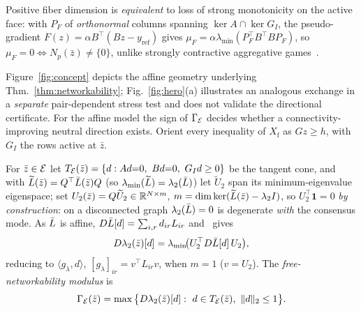 Positive fiber dimension is \emph{equivalent} to loss of strong monotonicity on the active
face: with $P_F$ of \emph{orthonormal} columns spanning $\ker A\cap\ker G_I$, the
pseudo-gradient $F(z)=\alpha B^{\top}(Bz-y_{\mathrm{ref}})$ gives
$\mu_F=\alpha\lambda_{\min}(P_F^{\top}B^{\top}BP_F)$, so $\mu_F=0\iff N_p(\bar z)\neq\{0\}$,
unlike strongly contractive aggregative games~\cite{martinezpiazuelo2022}.

Figure~\ref{fig:concept} depicts the affine geometry underlying
Thm.~\ref{thm:networkability}; Fig.~\ref{fig:hero}(a) illustrates an analogous exchange in a
\emph{separate} pair-dependent stress test and does not validate the directional certificate.
For the affine model the sign of $\Gamma_{\mathcal{E}}$ decides whether a
connectivity-improving neutral direction exists. Orient every inequality of $X_{\mathrm f}$ as
$Gz\ge h$, with $G_I$ the rows active at $\bar z$.

\begin{definition}\label{def:gamma}
For $\bar z\in\mathcal{E}$ let $T_{\Emanifold}(\bar z)=\{d:Ad{=}0,\ Bd{=}0,\ G_Id\ge0\}$ be the
tangent cone, and with $\widetilde L(\bar z)=Q^{\top}\bar L(\bar z)Q$ (so
$\lambda_{\min}(\widetilde L)=\lambda_2(\bar L)$) let $\widetilde U_2$ span its
minimum-eigenvalue eigenspace; set $U_2(\bar z)=Q\widetilde U_2\in\mathbb{R}^{N\times m}$,
$m=\dim\ker(\widetilde L(\bar z)-\lambda_2 I)$,
so $U_2^{\top}\mathbf1=0$ \emph{by construction}: on a disconnected graph $\lambda_2(\bar L)=0$ is
degenerate \emph{with} the consensus mode. As $\bar L$ is affine,
$D\bar L[d]=\sum_{i,r}d_{ir}L_{ir}$ and~\cite{lewis1996spectral} gives
\begin{equation}
D\lambda_2(\bar z)[d]=\lambda_{\min}\!\big(U_2^{\top}D\bar L[d]\,U_2\big),
\label{eq:dirderiv}
\end{equation}
reducing to $\langle g_\lambda,d\rangle$, $[g_\lambda]_{ir}=v^{\top}L_{ir}v$, when $m=1$
($v=U_2$). The \emph{free-networkability modulus} is
\begin{equation}
\Gamma_{\mathcal{E}}(\bar z)=\max\big\{D\lambda_2(\bar z)[d]:\
d\in T_{\mathcal{E}}(\bar z),\ \|d\|_2\le1\big\}.
\label{eq:gamma}
\end{equation}
\end{definition}

